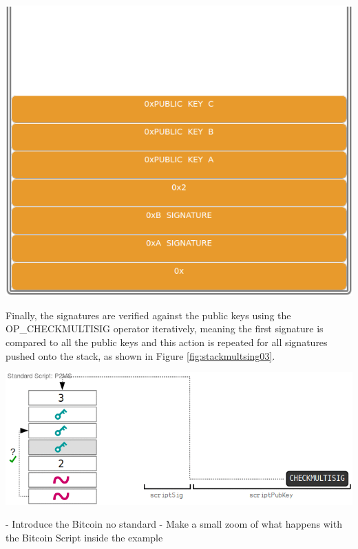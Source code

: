 \begin{example}
    {\centering
    \vspace{15pt}
    \includegraphics[scale=0.35]{imgs/script/multisig/2.png}
    \vspace{10pt}
    \par}
   
    Finally, the signatures are verified against the public keys using the 
    OP\_CHECKMULTISIG operator iteratively, meaning the first signature is compared to 
    all the public keys and this action is repeated for all signatures pushed onto the stack, 
    as shown in Figure \ref{fig:stackmultsing03}.
 
    {\centering
    \vspace{15pt}
    \includegraphics[scale=0.35]{imgs/script/multisig/3.png}
    \vspace{10pt}
    \par}

\end{example}

- Introduce the Bitcoin no standard
- Make a small zoom of what happens with the Bitcoin Script inside the example
